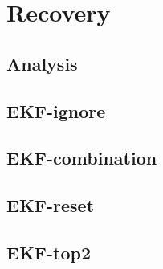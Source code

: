 \chapter{Recovery}
\label{chap:Recovery}

\section{Analysis}

\section{EKF-ignore}

\section{EKF-combination}

\section{EKF-reset}

\section{EKF-top2}
